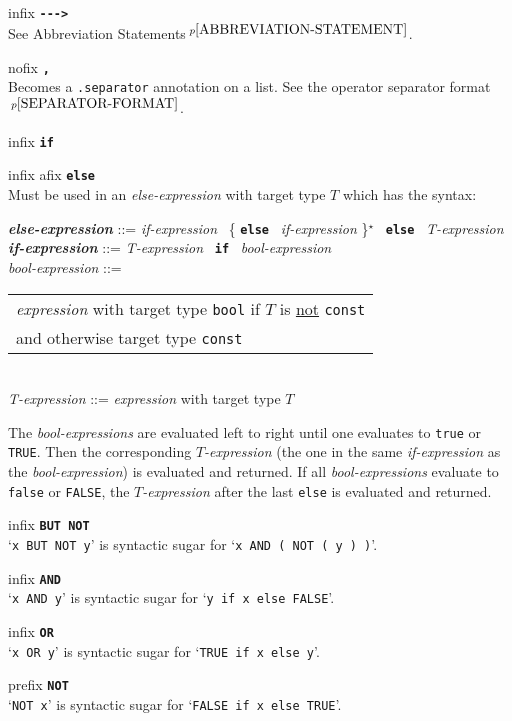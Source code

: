 \documentclass[12pt]{article}
\newcommand{\TT}[1]{{\tt \bfseries #1}}
\newcommand{\STAR}{{\Large $^\star$}}
\newcommand{\ttkey}[1]{{\tt \bfseries #1}}
\newcommand{\emkey}[1]{{\em \bfseries #1}}
\newcommand{\pagnote}[1]{$\,^{p\pageref{#1}}$}
\newenvironment{indpar}[1][0.3in]%
	{\begin{list}{}%
		     {\setlength{\itemsep}{0in}%
		      \setlength{\topsep}{0in}%
		      \setlength{\parsep}{1ex}%
		      \setlength{\labelwidth}{#1}%
		      \setlength{\leftmargin}{#1}%
		      \addtolength{\leftmargin}{\labelsep}}%
	 \item}%
	{\end{list}}
\newenvironment{itemlist}[1][1.2in]%
	{\begin{list}{}{\setlength{\labelwidth}{#1}%
		        \setlength{\leftmargin}{\labelwidth}%
		        \addtolength{\leftmargin}{+0.2in}%
		        \renewcommand{\makelabel}[1]{##1\hfill}}}%
	{\end{list}}
\begin{document}
\begin{itemlist}[0.2in]
\item[infix \TT{-{}-{}-{}>}] ~\\
See Abbreviation Statements\pagnote{ABBREVIATION-STATEMENT}.

\item[nofix \TT{,}] ~\\
Becomes a {\tt .separator} annotation on a list.  See
the operator separator format\pagnote{SEPARATOR-FORMAT}.

\item[infix \TT{if}]
\item[infix afix \TT{else}] \vspace*{-0.15in} ~\\
Must be used in an {\em else-expression} with target
type $T$ which has the syntax:
\begin{indpar}[0.2in]
\emkey{else-expression} ::=
    {\em if-expression}~ \{ \ttkey{else}~ {\em if-expression} \}\STAR{}~
    \ttkey{else}~ {\em T-expression}
\\[0.5ex]
\emkey{if-expression} ::=
    {\em T-expression}~ \ttkey{if}~ {\em bool-expression}
\\[0.5ex]
{\em bool-expression} ::=
    \begin{tabular}[t]{@{}l@{}}
    {\em expression} with target type {\tt bool}
	if $T$ is \underline{not} {\tt const} \\
    and otherwise target type {\tt const}
    \end{tabular}
\\[0.5ex]
{\em T-expression} ::= {\em expression} with target type $T$
\end{indpar}
The {\em bool-expressions} are evaluated left to right until one
evaluates to {\tt true} or {\tt TRUE}.
Then the corresponding {\em $T$-expression}
(the one in the same {\em if-expression} as the {\em bool-expression})
is evaluated and returned.  If all {\em bool-expressions} evaluate to
{\tt false} or {\tt FALSE}, the {\em $T$-expression} after the last {\tt else}
is evaluated and returned.

\item[infix \TT{BUT NOT}] ~\\
`{\tt x BUT NOT y}' is syntactic sugar for `{\tt x AND ( NOT ( y ) )}'.

\item[infix \TT{AND}] ~\\
`{\tt x AND y}' is syntactic sugar for `{\tt y if x else FALSE}'.

\item[infix \TT{OR}] ~\\
`{\tt x OR y}' is syntactic sugar for `{\tt TRUE if x else y}'.

\item[prefix \TT{NOT}] ~\\
`{\tt NOT x}' is syntactic sugar for `{\tt FALSE if x else TRUE}'.

\end{itemlist}
\end{document}
